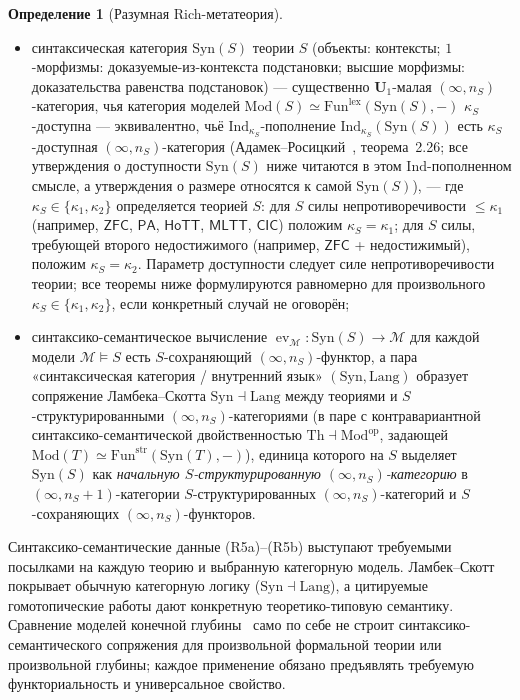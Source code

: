 \documentclass[11pt]{article}
\theoremstyle{plain}
\theoremstyle{definition}
\newtheorem{definition}[theorem]{Определение}
\newcommand{\cM}{\mathcal{M}}
\newcommand{\Fun}{\mathrm{Fun}}
\newcommand{\Syn}{\mathrm{Syn}}
\newcommand{\Mod}{\mathrm{Mod}}
\newcommand{\PA}{\mathsf{PA}}
\newcommand{\ZFC}{\mathsf{ZFC}}
\newcommand{\MLTT}{\mathsf{MLTT}}
\newcommand{\HoTT}{\mathsf{HoTT}}
\newcommand{\CIC}{\mathsf{CIC}}
\DeclareMathOperator{\ev}{ev}
\begin{document}
\begin{definition}[Разумная Rich-метатеория]
\begin{itemize}
\begin{itemize}
\item[\textbf{(R5a)}] синтаксическая категория $\Syn(S)$ теории $S$ (объекты: контексты; $1$-морфизмы: доказуемые-из-контекста подстановки; высшие морфизмы: доказательства равенства подстановок) — существенно $\mathbf{U}_1$-малая $(\infty, n_S)$-категория, чья категория моделей $\Mod(S) \simeq \Fun^{\mathrm{lex}}(\Syn(S), -)$ $\kappa_S$-доступна --- эквивалентно, чьё $\mathrm{Ind}_{\kappa_S}$-пополнение $\mathrm{Ind}_{\kappa_S}(\Syn(S))$ есть $\kappa_S$-доступная $(\infty, n_S)$-категория (Адамек--Росицкий~\cite{AdamekRosicky1994}, теорема~2.26; все утверждения о доступности $\Syn(S)$ ниже читаются в этом $\mathrm{Ind}$-пополненном смысле, а утверждения о размере относятся к самой $\Syn(S)$), --- где $\kappa_S \in \{\kappa_1, \kappa_2\}$ определяется теорией $S$: для $S$ силы непротиворечивости $\leq \kappa_1$ (например, $\ZFC$, $\PA$, $\HoTT$, $\MLTT$, $\CIC$) положим $\kappa_S = \kappa_1$; для $S$ силы, требующей второго недостижимого (например, $\ZFC$ + недостижимый), положим $\kappa_S = \kappa_2$. Параметр доступности следует силе непротиворечивости теории; все теоремы ниже формулируются равномерно для произвольного $\kappa_S \in \{\kappa_1, \kappa_2\}$, если конкретный случай не оговорён;
\item[\textbf{(R5b)}] синтаксико-семантическое вычисление $\ev_\cM : \Syn(S) \to \cM$ для каждой модели $\cM \models S$ есть $S$-сохраняющий $(\infty, n_S)$-функтор, а пара «синтаксическая категория / внутренний язык» $(\Syn, \mathrm{Lang})$ образует сопряжение Ламбека--Скотта $\Syn \dashv \mathrm{Lang}$ между теориями и $S$-структурированными $(\infty, n_S)$-категориями (в паре с контравариантной синтаксико-семантической двойственностью $\mathrm{Th} \dashv \Mod^{\mathrm{op}}$, задающей $\Mod(T) \simeq \Fun^{\mathrm{str}}(\Syn(T), -)$), единица которого на $S$ выделяет $\Syn(S)$ как \emph{начальную $S$-структурированную $(\infty, n_S)$-категорию} в $(\infty, n_S + 1)$-категории $S$-структурированных $(\infty, n_S)$-категорий и $S$-сохраняющих $(\infty, n_S)$-функторов.
\end{itemize}
Синтаксико-семантические данные (R5a)--(R5b) выступают требуемыми посылками на каждую теорию и выбранную категорную модель. Ламбек--Скотт~\cite{LambekScott1986} покрывает обычную категорную логику ($\Syn \dashv \mathrm{Lang}$), а цитируемые гомотопические работы дают конкретную теоретико-типовую семантику. Сравнение моделей конечной глубины~\cite{BarwickSchommerPries2021,BergnerRezk2013} само по себе не строит синтаксико-семантического сопряжения для произвольной формальной теории или произвольной глубины; каждое применение обязано предъявлять требуемую функториальность и универсальное свойство.

\end{itemize}
\end{definition}
\end{document}
